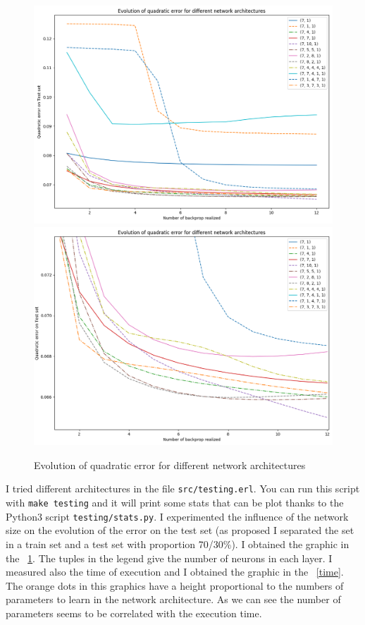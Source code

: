 \documentclass[12pt]{article}
\begin{document}
\begin{figure}
	\centering
	\includegraphics[scale=0.5]{error.png}
	\includegraphics[scale=0.5]{error_zoom.png}
	\captionsetup{justification=centering}
	\caption{Evolution of quadratic error for different network architectures}
	\label{err}
\end{figure}

I tried different architectures in the file \verb|src/testing.erl|. You can run this script with \verb|make testing| and it will print some stats that can be plot thanks to the Python3 script \verb|testing/stats.py|. I experimented the influence of the network size on the evolution of the error on the test set (as proposed I separated the set in a train set and a test set with proportion 70/30\%). I obtained the graphic in the \figurename~\ref{err}. The tuples in the legend give the number of neurons in each layer. I measured also the time of execution and I obtained the graphic in the \figurename~\ref{time}. The orange dots in this graphics have a height proportional to the numbers of parameters to learn in the network architecture. As we can see the number of parameters seems to be correlated with the execution time.
\end{document}
